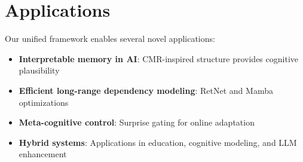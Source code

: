 \section{Applications}
Our unified framework enables several novel applications:

\begin{itemize}
\item \textbf{Interpretable memory in AI}: CMR-inspired structure provides cognitive plausibility
\item \textbf{Efficient long-range dependency modeling}: RetNet and Mamba optimizations
\item \textbf{Meta-cognitive control}: Surprise gating for online adaptation
\item \textbf{Hybrid systems}: Applications in education, cognitive modeling, and LLM enhancement
\end{itemize}
